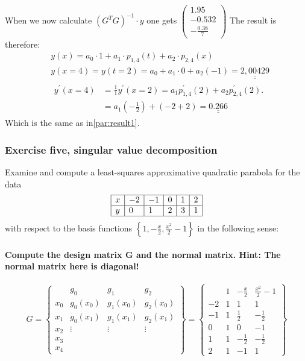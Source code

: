 When we now calculate $(G^{T}G)^{-1}\cdot y$ one gets $\left(\begin{array}{c}
1.95 \\
-0.532 \\
-\frac{0.38}{7}
\end{array}\right)$
The result is therefore:
$$
\begin{aligned}
&y(x)=a_0 \cdot 1+a_1 \cdot p_{1,4}(t)+a_2 \cdot p_{2,4}(x)\\
&y(x=4)=y(t=2)=a_0+a_1 \cdot 0+a_2(-1)=\underline{\underline{2,00429}}\\
&\begin{aligned}
y^{\prime}(x=4)&=\frac{1}{1} y^{\prime}(x=2)=a_1 p_{1,4}^{\prime}(2)+a_2 p_{2,4}^{\prime}(2).\\
&=a_1\left(-\frac{1}{2}\right)+\left(-2+2\right)=\underline{\underline{0.266}}
\end{aligned}
\end{aligned}
$$
Which is the same as in\autoref{par:result1}.







\subsubsection{Exercise five, singular value decomposition}
Examine and compute a least-squares approximative quadratic parabola for the data
$$
\begin{array}{|l|l|l|l|l|l|}
\hline x & -2 & -1 & 0 & 1 & 2 \\
\hline y & 0 & 1 & 2 & 3 & 1 \\
\hline
\end{array}
$$
with respect to the basis functions $\left\{1,-\frac{x}{2}, \frac{x^2}{2}-1\right\}$ in the following sense:
\paragraph{Compute the design matrix G and the normal matrix. Hint: The normal matrix here is diagonal!}
$$
G=
\left\{\begin{array}{c|ccc}
 & g_0 & g_1 & g_2 \\
\hline 
x_0 & g_0\left(x_0\right) & g_1\left(x_0\right) & g_2\left(x_0\right) \\
x_1 & g_0\left(x_1\right) & g_1\left(x_1\right) & g_2\left(x_1\right)\\
x_2 &\vdots&\vdots&\vdots \\
x_3 &  \\
x_4 &  
\end{array}\right\}
=
\left\{\begin{array}{c|ccc}
 & 1 & -\frac{x}{2} & \frac{x^2}{2}-1 \\
\hline 
-2 & 1 & 1 & 1 \\
-1 & 1 & \frac{1}{2} & -\frac{1}{2} \\
0 & 1 & 0 & -1 \\
1 & 1 & -\frac{1}{2} & -\frac{1}{2} \\
2 & 1 & -1 & 1 
\end{array}\right\}
$$

